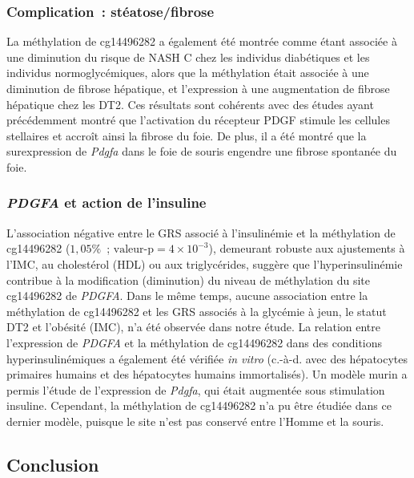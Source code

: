 \documentclass[11pt,a4paper,notrimn]{krantz}
\theoremstyle{definition}
\theoremstyle{definition}
\theoremstyle{remark}
\begin{document}
\subsubsection{Complication~:
stéatose/fibrose}\label{complication-steatosefibrose}

La méthylation de cg14496282 a également été montrée comme étant
associée à une diminution du risque de NASH C chez les individus
diabétiques et les individus normoglycémiques, alors que la méthylation
était associée à une diminution de fibrose hépatique, et l'expression à
une augmentation de fibrose hépatique chez les DT2. Ces résultats sont
cohérents avec des études ayant précédemment montré que l'activation du
récepteur PDGF stimule les cellules stellaires et accroît ainsi la
fibrose du foie. De plus, il a été montré que la surexpression de
\emph{Pdgfa} dans le foie de souris engendre une fibrose spontanée du
foie.

\subsubsection{\texorpdfstring{\emph{PDGFA} et action de
l'insuline}{PDGFA et action de l'insuline}}\label{pdgfa-et-action-de-linsuline}

L'association négative entre le GRS associé à l'insulinémie et la
méthylation de cg14496282 (\(1,05 \%\)~;
\(\textrm{valeur-p}=4\times 10^{-3}\)), demeurant robuste aux
ajustements à l'IMC, au cholestérol (HDL) ou aux triglycérides, suggère
que l'hyperinsulinémie contribue à la modification (diminution) du
niveau de méthylation du site cg14496282 de \emph{PDGFA}. Dans le même
temps, aucune association entre la méthylation de cg14496282 et les GRS
associés à la glycémie à jeun, le statut DT2 et l'obésité (IMC), n'a été
observée dans notre étude. La relation entre l'expression de
\emph{PDGFA} et la méthylation de cg14496282 dans des conditions
hyperinsulinémiques a également été vérifiée \emph{in vitro} (c.-à-d.
avec des hépatocytes primaires humains et des hépatocytes humains
immortalisés). Un modèle murin a permis l'étude de l'expression de
\emph{Pdgfa}, qui était augmentée sous stimulation insuline. Cependant,
la méthylation de cg14496282 n'a pu être étudiée dans ce dernier modèle,
puisque le site n'est pas conservé entre l'Homme et la souris.

\subsection{Conclusion}\label{conclusion-2}
\end{document}
